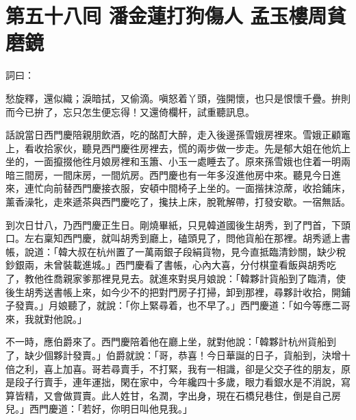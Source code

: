 
\chapter*{第五十八囘 潘金蓮打狗傷人 孟玉樓周貧磨鏡}


詞曰：

\begin{myquote} 
愁旋釋，還似織；淚暗拭，又偷滴。嗔怒着丫頭，強開懷，也只是恨懷千疊。拚則而今已拚了，忘只怎生便忘得！又還倚欄杆，試重聽訊息。

\end{myquote} 

話說當日西門慶陪親朋飲酒，吃的酩酊大醉，走入後邊孫雪娥房裡來。雪娥正顧竈上，看收拾家伙，聽見西門慶徃房裡去，慌的兩步做一步走。{}先是郁大姐在他炕上坐的，一面攛掇他徃月娘房裡和玉簫、小玉一處睡去了。原來孫雪娥也住着一明兩暗三間房，一間床房，一間炕房。西門慶也有一年多沒進他房中來。聽見今日進來，連忙向前替西門慶接衣服，安頓中間椅子上坐的。一面揩抹涼蓆，收拾鋪床，薰香澡牝，走來遞茶與西門慶吃了，攙扶上床，脫靴解帶，打發安歇。一宿無話。

到次日廿八，乃西門慶正生日。剛燒畢紙，只見韓道國後生胡秀，到了門首，下頭口。左右稟知西門慶，就叫胡秀到廳上，磕頭見了，問他貨船在那裡。胡秀遞上書帳，說道：「韓大叔在杭州置了一萬兩銀子段絹貨物，見今直抵臨清鈔關，缺少稅鈔銀兩，未曾裝載進城。」西門慶看了書帳，心內大喜，分付棋童看飯與胡秀吃了，教他徃喬親家爹那裡見見去。就進來對吳月娘說：「韓夥計貨船到了臨清，使後生胡秀送書帳上來，如今少不的把對門房子打掃，卸到那裡，尋夥計收拾，開鋪子發賣。」月娘聽了，就說：「你上緊尋着，也不早了。」西門慶道：「如今等應二哥來，我就對他說。」

不一時，應伯爵來了。西門慶陪着他在廳上坐，就對他說：「韓夥計杭州貨船到了，缺少個夥計發賣。」伯爵就說：「哥，恭喜！今日華誕的日子，貨船到，決增十倍之利，喜上加喜。{}哥若尋賣手，不打緊，我有一相識，卻是父交子徃的朋友，原是段子行賣手，連年運拙，閑在家中，今年纔四十多歲，眼力看銀水是不消說，寫算皆精，又會做買賣。此人姓甘，名潤，字出身，現在石橋兒巷住，倒是自己房兒。」西門慶道：「若好，你明日叫他見我。」

